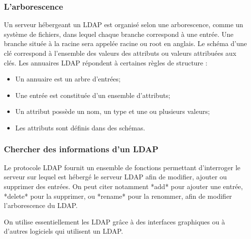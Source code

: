 \subsubsection{L'arborescence}

Un serveur hébergeant un LDAP est organisé selon une arborescence, comme un système de fichiers, dans lequel chaque branche
correspond à une entrée. Une branche située à la racine sera appelée racine ou root en anglais.
Le schéma d'une clé correspond à l'ensemble des valeurs des attributs ou valeurs attribuées aux clés.
Les annuaires LDAP répondent à certaines règles de structure :
\begin{itemize}
    \item Un annuaire est un arbre d'entrées;
    \item Une entrée est constituée d'un ensemble d'attributs;
    \item Un attribut possède un nom, un type et une ou plusieurs valeurs;
    \item Les attributs sont définis dans des schémas.
\end{itemize}


\subsubsection{Chercher des informations d'un LDAP}

Le protocole LDAP fournit un ensemble de fonctions permettant d'interroger le
serveur sur lequel est hébergé le serveur LDAP afin de modifier, ajouter ou
supprimer des entrées. On peut citer notamment *add* pour ajouter une entrée,
 *delete* pour la supprimer, ou *rename* pour la renommer, afin de modifier
 l'arborescence du LDAP.

On utilise essentiellement les LDAP grâce à des interfaces graphiques ou à
d'autres logiciels qui utilisent un LDAP.
